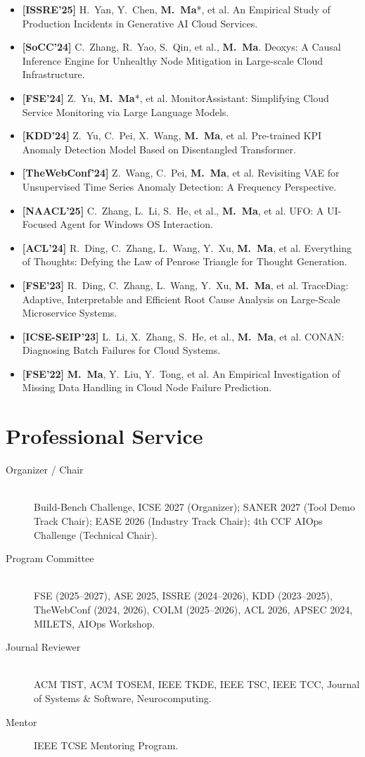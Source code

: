 \documentclass[10pt,letterpaper]{article}
\newcommand{\pub}[3]{\item {\color{accent}\textbf{[#3'#2]}}\; #1.}
\begin{document}
\begin{itemize}[leftmargin=1.6em, label={}, itemsep=0.35ex]
  \pub{H.\ Yan, Y.\ Chen, \textbf{M.\ Ma}*, et al. An Empirical Study of Production Incidents in Generative AI Cloud Services}{25}{ISSRE}
  \pub{C.\ Zhang, R.\ Yao, S.\ Qin, et al., \textbf{M.\ Ma}. Deoxys: A Causal Inference Engine for Unhealthy Node Mitigation in Large-scale Cloud Infrastructure}{24}{SoCC}
  \pub{Z.\ Yu, \textbf{M.\ Ma}*, et al. MonitorAssistant: Simplifying Cloud Service Monitoring via Large Language Models}{24}{FSE}
  \pub{Z.\ Yu, C.\ Pei, X.\ Wang, \textbf{M.\ Ma}, et al. Pre-trained KPI Anomaly Detection Model Based on Disentangled Transformer}{24}{KDD}
  \pub{Z.\ Wang, C.\ Pei, \textbf{M.\ Ma}, et al. Revisiting VAE for Unsupervised Time Series Anomaly Detection: A Frequency Perspective}{24}{TheWebConf}
  \pub{C.\ Zhang, L.\ Li, S.\ He, et al., \textbf{M.\ Ma}, et al. UFO: A UI-Focused Agent for Windows OS Interaction}{25}{NAACL}
  \pub{R.\ Ding, C.\ Zhang, L.\ Wang, Y.\ Xu, \textbf{M.\ Ma}, et al. Everything of Thoughts: Defying the Law of Penrose Triangle for Thought Generation}{24}{ACL}
  \pub{R.\ Ding, C.\ Zhang, L.\ Wang, Y.\ Xu, \textbf{M.\ Ma}, et al. TraceDiag: Adaptive, Interpretable and Efficient Root Cause Analysis on Large-Scale Microservice Systems}{23}{FSE}
  \pub{L.\ Li, X.\ Zhang, S.\ He, et al., \textbf{M.\ Ma}, et al. CONAN: Diagnosing Batch Failures for Cloud Systems}{23}{ICSE-SEIP}
  \pub{\textbf{M.\ Ma}, Y.\ Liu, Y.\ Tong, et al. An Empirical Investigation of Missing Data Handling in Cloud Node Failure Prediction}{22}{FSE}
\end{itemize}

\section{Professional Service}
\begin{description}
  \item[Organizer / Chair]\hfill\\ Build-Bench Challenge, ICSE 2027 (Organizer); SANER 2027 (Tool Demo Track Chair); EASE 2026 (Industry Track Chair); 4th CCF AIOps Challenge (Technical Chair).
  \item[Program Committee]\hfill\\ FSE (2025–2027), ASE 2025, ISSRE (2024–2026), KDD (2023–2025), TheWebConf (2024, 2026), COLM (2025–2026), ACL 2026, APSEC 2024, MILETS, AIOps Workshop.
  \item[Journal Reviewer]\hfill\\ ACM TIST, ACM TOSEM, IEEE TKDE, IEEE TSC, IEEE TCC, Journal of Systems \& Software, Neurocomputing.
  \item[Mentor] IEEE TCSE Mentoring Program.
\end{description}
\end{document}
